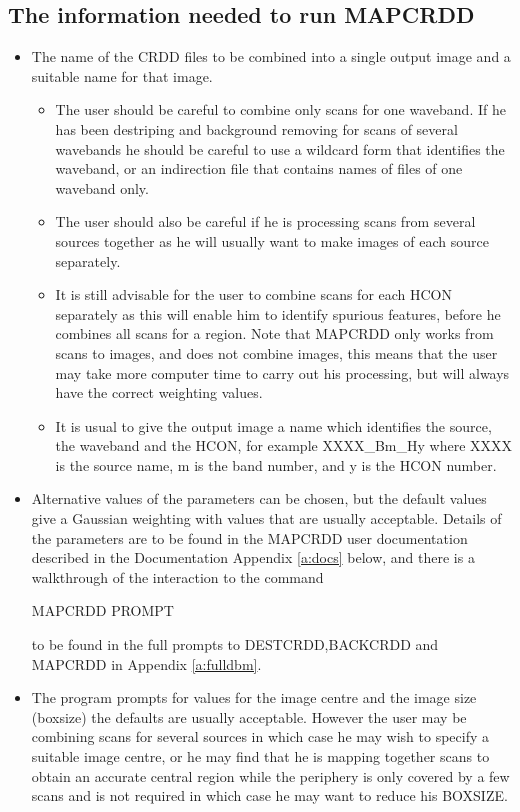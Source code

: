\documentclass[twoside,11pt]{starlink}
\begin{document}
\subsection{The information needed to run MAPCRDD}
\begin{itemize}
\item The name of the CRDD files to be combined into a single output image and
a suitable name for that image.
\begin{itemize}
\item The user should be careful to combine only scans for one waveband. If he
has been destriping and background removing for scans of several wavebands he
should be careful to use a wildcard form that identifies the waveband, or an
indirection file that contains names of files of one waveband only.
\item The user should also be careful if he is processing scans from several
sources together as he will usually want to make images of each source
separately.
\item It is still advisable for the user to combine scans for each HCON
separately as this will enable him to identify spurious features, before he
combines all scans for a region. Note that MAPCRDD only works from scans to
images, and does not combine images, this means that the user may take more
computer time to carry out his processing, but will always have the correct
weighting values.
\item It is usual to give the output image a name which identifies the source,
the waveband and the HCON, for example XXXX\_Bm\_Hy where XXXX is the source
name, m is the band number, and y is the HCON number.
\end{itemize}
\item Alternative values of the parameters can be chosen, but the default values
give a Gaussian weighting with values that are usually acceptable. Details of
the parameters are to be found in the MAPCRDD user documentation described in
the Documentation Appendix \ref{a:docs} below, and there is a walkthrough of
the interaction to the command
\begin{small}
\begin{terminalv}
MAPCRDD PROMPT
\end{terminalv}
\end{small}
to be found in the full prompts to DESTCRDD,BACKCRDD and MAPCRDD in Appendix
\ref {a:fulldbm}.
\item The program prompts for  values for the image  centre and the image size
(boxsize) the defaults are usually acceptable. However the user may be
combining scans for several sources in which case he may wish to specify a
suitable image centre, or he may find that he is mapping together scans to
obtain an accurate central region while the periphery is only covered by a few
scans and is not required in which case he may want to reduce his BOXSIZE.
\end{itemize}
\end{document}
